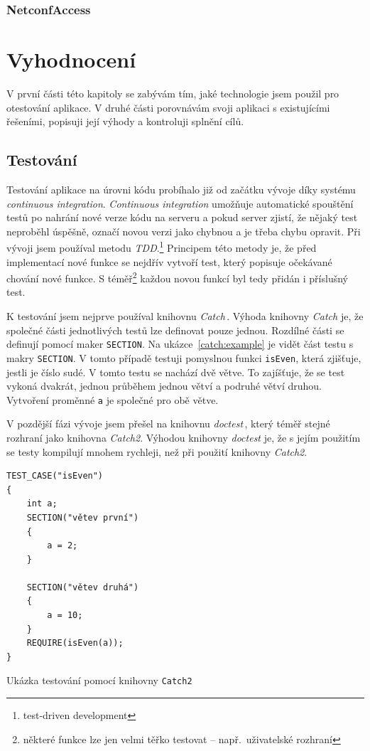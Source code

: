 \documentclass[thesis=B,czech,hidelinks]{FITthesis}[2019/03/06]
\begin{document}
\subsection{NetconfAccess}


\chapter{Vyhodnocení}
V první části této kapitoly se zabývám tím, jaké technologie jsem použil pro otestování aplikace. V druhé části porovnávám svoji aplikaci s existujícími řešeními, popisuji její výhody a kontroluji splnění cílů.
\section{Testování}
Testování aplikace na úrovni kódu probíhalo již od začátku vývoje díky systému \textit{continuous integration}. \textit{Continuous integration} umožňuje automatické spouštění testů po nahrání nové verze kódu na serveru a pokud server zjistí, že nějaký test neproběhl úspěšně, označí novou verzi jako chybnou a je třeba chybu opravit. Při vývoji jsem používal metodu \textit{TDD}.\footnote{test-driven development} Principem této metody je, že před implementací nové funkce se nejdřív vytvoří test, který popisuje očekávané chování nové funkce. S téměř\footnote{některé funkce lze jen velmi těřko testovat -- např.\ uživatelské rozhraní} každou novou funkcí byl tedy přidán i příslušný test.

K testování jsem nejprve používal knihovnu \textit{Catch}\,\cite{catch2}. Výhoda knihovny \textit{Catch} je, že společné části jednotlivých testů lze definovat pouze jednou. Rozdílné části se definují pomocí maker \texttt{SECTION}. Na ukázce~\ref{catch:example} je vidět část testu s makry \texttt{SECTION}. V tomto případě testuji pomyslnou funkci \texttt{isEven}, která zjišťuje, jestli je číslo sudé. V tomto testu se nachází dvě větve. To zajíšťuje, že se test vykoná dvakrát, jednou průběhem jednou větví a podruhé větví druhou. Vytvoření proměnné \texttt{a} je společné pro obě větve.

V pozdější fázi vývoje jsem přešel na knihovnu \textit{doctest}\,\cite{doctest}, který téměř stejné rozhraní jako knihovna \textit{Catch2}. Výhodou knihovny \textit{doctest} je, že s jejím použitím se testy kompilují mnohem rychleji, než při použití knihovny \textit{Catch2}.

\begin{listing}
\begin{verbatim}
TEST_CASE("isEven")
{
    int a;
    SECTION("větev první")
    {
        a = 2;
    }

    SECTION("větev druhá")
    {
        a = 10;
    }
    REQUIRE(isEven(a));
}
\end{verbatim}
\caption{Ukázka testování pomocí knihovny \texttt{Catch2}}\label{catch:example}
\end{listing}
\end{document}
